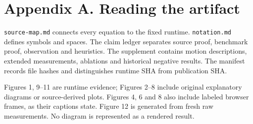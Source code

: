 \documentclass[
  english,
  11pt,
]{article}
\begin{document}
\section{Appendix A. Reading the
artifact}\label{appendix-a.-reading-the-artifact}

\texttt{source-map.md} connects every equation to the fixed runtime.
\texttt{notation.md} defines symbols and spaces. The claim ledger
separates source proof, benchmark proof, observation and heuristics. The
supplement contains motion descriptions, extended measurements,
ablations and historical negative results. The manifest records file
hashes and distinguishes runtime SHA from publication SHA.

Figures 1, 9--11 are runtime evidence; Figures 2--8 include original
explanatory diagrams or source-derived plots. Figures 4, 6 and 8 also
include labeled browser frames, as their captions state. Figure 12 is
generated from fresh raw measurements. No diagram is represented as a
rendered result.
\end{document}
